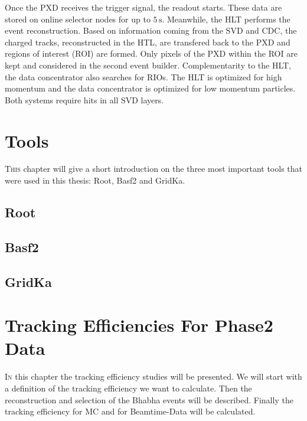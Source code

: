 \documentclass[a4paper,11pt,twosided,final,german,openbib,pdftex,listof=totoc,bibliography=totoc]{scrbook}
\begin{document}
Once the PXD receives the trigger signal, the readout starts. These data are stored on online selector nodes for up to $5\,\textrm{s}$. Meanwhile, the HLT performs the event reconstruction. Based on information coming from the SVD and CDC, the charged tracks, reconstructed in the HTL, are transfered back to the PXD and regions of interest (ROI) are formed. Only pixels of the PXD within the ROI are kept and considered in the second event builder. Complementarity to the HLT, the data concentrator also searches for RIOs. The HLT is optimized for high momentum and the data concentrator is optimized for low momentum particles. Both systems require hits in all SVD layers. 





\chapter{Tools}
\label{sec:Tools}

\lettrine{T}{his} chapter will give a short introduction on the three most important tools that were used in this thesis: Root, Basf2 and GridKa.



\section{Root}


\section{Basf2}




\section{GridKa}






\chapter{Tracking Efficiencies For Phase2 Data}
\label{sec:TrackingEff}

\lettrine{I}{n} this chapter the tracking efficiency studies will be presented. We will start with a definition of the tracking efficiency we want to calculate. Then the reconstruction and selection of the Bhabha events will be described. Finally the tracking efficiency for MC and for Beamtime-Data will be calculated.
\end{document}
